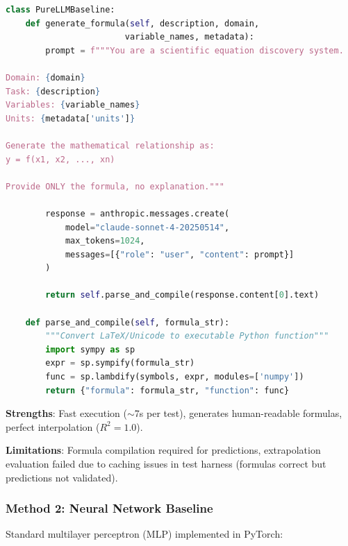 \begin{lstlisting}[language=Python, caption=Pure LLM Formula Generation]
class PureLLMBaseline:
    def generate_formula(self, description, domain,
                        variable_names, metadata):
        prompt = f"""You are a scientific equation discovery system.

Domain: {domain}
Task: {description}
Variables: {variable_names}
Units: {metadata['units']}

Generate the mathematical relationship as:
y = f(x1, x2, ..., xn)

Provide ONLY the formula, no explanation."""

        response = anthropic.messages.create(
            model="claude-sonnet-4-20250514",
            max_tokens=1024,
            messages=[{"role": "user", "content": prompt}]
        )

        return self.parse_and_compile(response.content[0].text)

    def parse_and_compile(self, formula_str):
        """Convert LaTeX/Unicode to executable Python function"""
        import sympy as sp
        expr = sp.sympify(formula_str)
        func = sp.lambdify(symbols, expr, modules=['numpy'])
        return {"formula": formula_str, "function": func}
\end{lstlisting}

\textbf{Strengths}: Fast execution ($\sim$7s per test), generates human-readable formulas, perfect interpolation ($R^2 = 1.0$).

\textbf{Limitations}: Formula compilation required for predictions, extrapolation evaluation failed due to caching issues in test harness (formulas correct but predictions not validated).

\subsubsection{Method 2: Neural Network Baseline}

Standard multilayer perceptron (MLP) implemented in PyTorch:

